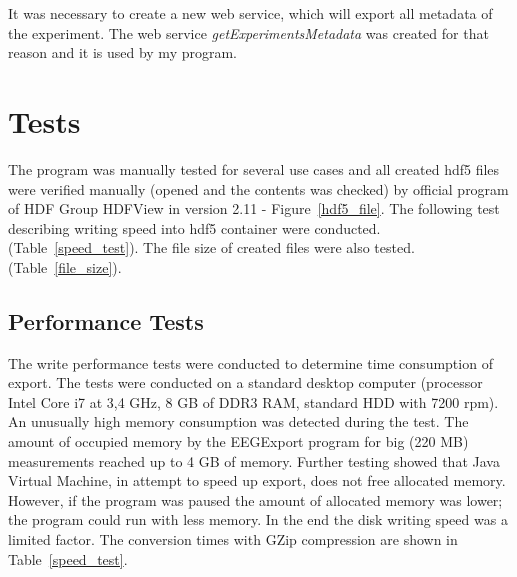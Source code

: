 It was necessary to create a new web service, which will export all metadata of the experiment. The web service \textit{getExperimentsMetadata} was created for that reason and it is used by my program.


\chapter{Tests}

The program was manually tested for several use cases and all created \gls{hdf5} files were verified manually (opened and the contents was checked) by official program of HDF Group HDFView \cite{hdfjava} in version 2.11 - Figure~\ref{hdf5_file}. The following test describing writing speed into \gls{hdf5} container were conducted. (Table~\ref{speed_test}). The file size of created files were also tested. (Table~\ref{file_size}).



\section{Performance Tests}

The write performance tests were conducted to determine time consumption of export. The tests were conducted on a standard desktop computer (processor Intel Core i7 at 3,4 GHz, 8 GB of DDR3 RAM, standard HDD with 7200 rpm). An unusually high memory consumption was detected during the test. The amount of occupied memory by the EEGExport program for big (220 MB) measurements reached up to 4 GB of memory. Further testing showed that Java Virtual Machine, in attempt to speed up export, does not free allocated memory. However, if the program was paused the amount of allocated memory was lower; the program could run with less memory. In the end the disk writing speed was a limited factor. The conversion times with GZip compression are shown in Table~\ref{speed_test}.

